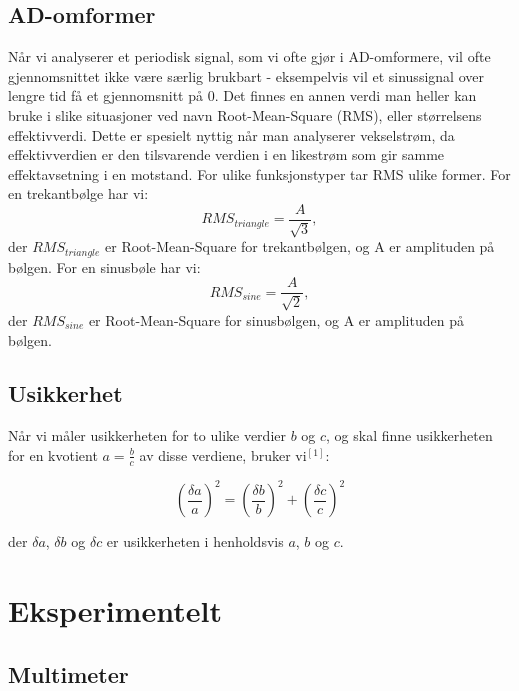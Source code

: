 \documentclass[norsk,a4paper,12pt]{article}
\begin{document}
\subsection{AD-omformer}
Når vi analyserer et periodisk signal, som vi ofte gjør i AD-omformere, vil ofte gjennomsnittet ikke være særlig brukbart - eksempelvis vil et sinussignal over lengre tid få et gjennomsnitt på 0. Det finnes en annen verdi man heller kan bruke i slike situasjoner ved navn Root-Mean-Square (RMS), eller størrelsens effektivverdi. Dette er spesielt nyttig når man analyserer vekselstrøm, da effektivverdien er den tilsvarende verdien i en likestrøm som gir samme effektavsetning i en motstand.
For ulike funksjonstyper tar RMS ulike former. 
For en trekantbølge har vi:
\begin{equation}
RMS_{triangle} = \frac{A}{\sqrt{3}},
\label{eq:rmstriangle}
\end{equation}
der $RMS_{triangle}$ er Root-Mean-Square for trekantbølgen, og A er amplituden på bølgen.
For en sinusbøle har vi:
\begin{equation}
RMS_{sine} = \frac{A}{\sqrt{2}},
\label{eq:rmssine}
\end{equation}
der $RMS_{sine}$ er Root-Mean-Square for sinusbølgen, og A er amplituden på bølgen.

\subsection{Usikkerhet}

Når vi måler usikkerheten for to ulike verdier $b$ og $c$, og skal finne usikkerheten for en kvotient $a = \frac{b}{c}$ av disse verdiene, bruker vi$^{[1]}$:

\begin{equation}
\left(\frac{\delta a}{a}\right)^2 = \left(\frac{\delta b}{b}\right)^2 + \left(\frac{\delta c}{c}\right)^2
\label{eq:uncertainty}
\end{equation}

der $\delta a$, $\delta b$ og $\delta c$ er usikkerheten i henholdsvis $a$, $b$ og $c$.



\section{Eksperimentelt}
\subsection{Multimeter}
\end{document}
